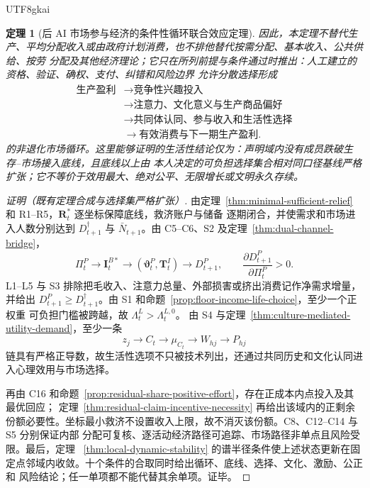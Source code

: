 \documentclass[12pt,a4paper,openany]{report}
\newtheorem{theorem}{定理}[chapter]
\begin{document}
\begin{CJK*}{UTF8}{gkai}
\begin{theorem}[后 AI 市场参与经济的条件性循环联合效应定理]
因此，本定理不替代生产、平均分配收入或由政府计划消费，也不排他替代按需分配、基本收入、公共供给、按劳
分配及其他经济理论；它只在所列前提与条件通过时推出：人工建立的资格、验证、确权、支付、纠错和风险边界
允许分散选择形成
\[
  \begin{aligned}
    \text{生产盈利}
    &\longrightarrow \text{竞争性兴趣投入}\\
    &\longrightarrow \text{注意力、文化意义与生产商品偏好}\\
    &\longrightarrow \text{共同体认同、参与收入和生活性选择}\\
    &\longrightarrow \text{有效消费与下一期生产盈利}.
  \end{aligned}
\]
的非退化市场循环。这里能够证明的生活性结论仅为：声明域内没有成员跌破生存--市场接入底线，且底线以上由
本人决定的可负担选择集合相对同口径基线严格扩张；它不等价于效用最大、绝对公平、无限增长或文明永久存续。
\end{theorem}

\begin{proof}[证明（既有定理合成与选择集严格扩张）]
由定理~\ref{thm:minimal-sufficient-relief} 和 R1--R5，\(\mathbf R_t^*\) 逐坐标保障底线，救济账户与储备
逐期闭合，并使需求和市场进入人数分别达到 \(D_{t+1}^{\dagger}\) 与 \(\bar N_{t+1}\)。由 C5--C6、S2
及定理~\ref{thm:dual-channel-bridge}，
\[
  \Pi_t^P
  \to\mathbf I_t^{B*}
  \to(\boldsymbol\vartheta_t^P,\mathbf T_t^I)
  \to D_{t+1}^P,
  \qquad
  \frac{\partial D_{t+1}^{P}}{\partial\Pi_t^{P}}>0.
\]
L1--L5 与 S3 排除把毛收入、注意力总量、外部损害或挤出消费记作净需求增量，并给出
\(D_{t+1}^{P}\ge D_{t+1}^{\dagger}\)。由 S1 和命题~\ref{prop:floor-income-life-choice}，至少一个正权重
可负担门槛被跨越，故 \(\Lambda_t^L>\Lambda_t^{L,0}\)。
由 S4 与定理~\ref{thm:culture-mediated-utility-demand}，至少一条
\[
  z_j\to C_t\to\mu_{C_t}\to W_{hj}\to P_{hj}
\]
链具有严格正导数，故生活性选项不只被技术列出，还通过共同历史和文化认同进入心理效用与市场选择。

再由 C16 和命题~\ref{prop:residual-share-positive-effort}，存在正成本内点投入及其最优回应；
定理~\ref{thm:residual-claim-incentive-necessity} 再给出该域内的正剩余份额必要性。坐标最小救济不设置收入上限，故不消灭该份额。C8、C12--C14 与 S5 分别保证内部
分配可复核、逐活动经济路径可追踪、市场路径非单点且风险受限。最后，定理
~\ref{thm:local-dynamic-stability} 的谱半径条件使上述状态更新在固定点邻域内收敛。十个条件的合取同时给出循环、底线、选择、文化、激励、公正和
风险结论；任一单项都不能代替其余单项。证毕。
\end{proof}


\end{CJK*}
\end{document}
